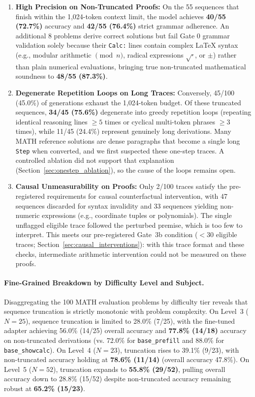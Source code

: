\documentclass[11pt,a4paper]{article}
\begin{document}
\begin{enumerate}
    \item \textbf{High Precision on Non-Truncated Proofs:} On the 55 sequences that finish within the 1,024-token context limit, the model achieves \textbf{40/55 (72.7\%)} accuracy and \textbf{42/55 (76.4\%)} strict grammar adherence. An additional 8 problems derive correct solutions but fail Gate 0 grammar validation solely because their \texttt{Calc:} lines contain complex \LaTeX{} syntax (e.g., modular arithmetic $\pmod{n}$, radical expressions $\sqrt{\cdot}$, or $\pm$) rather than plain numerical evaluations, bringing true non-truncated mathematical soundness to \textbf{48/55 (87.3\%)}.
    \item \textbf{Degenerate Repetition Loops on Long Traces:} Conversely, 45/100 (45.0\%) of generations exhaust the 1,024-token budget. Of these truncated sequences, \textbf{34/45 (75.6\%)} degenerate into greedy repetition loops (repeating identical reasoning lines $\ge 5$ times or cyclical multi-token phrases $\ge 3$ times), while 11/45 (24.4\%) represent genuinely long derivations. Many MATH reference solutions are dense paragraphs that become a single long \texttt{Step} when converted, and we first suspected these one-step traces. A controlled ablation did not support that explanation (Section~\ref{sec:onestep_ablation}), so the cause of the loops remains open.
    \item \textbf{Causal Unmeasurability on Proofs:} Only 2/100 traces satisfy the pre-registered requirements for causal counterfactual intervention, with 47 sequences discarded for syntax invalidity and 33 sequences yielding non-numeric expressions (e.g., coordinate tuples or polynomials). The single unflagged eligible trace followed the perturbed premise, which is too few to interpret. This meets our pre-registered Gate~3b condition ($< 30$ eligible traces; Section~\ref{sec:causal_interventions}): with this trace format and these checks, intermediate arithmetic intervention could not be measured on these proofs.
\end{enumerate}

\paragraph{Fine-Grained Breakdown by Difficulty Level and Subject.}
Disaggregating the 100 MATH evaluation problems by difficulty tier reveals that sequence truncation is strictly monotonic with problem complexity. On Level~3 ($N=25$), sequence truncation is limited to 28.0\% (7/25), with the fine-tuned adapter achieving 56.0\% (14/25) overall accuracy and \textbf{77.8\% (14/18)} accuracy on non-truncated derivations (vs. 72.0\% for \texttt{base\_prefill} and 88.0\% for \texttt{base\_showcalc}). On Level~4 ($N=23$), truncation rises to 39.1\% (9/23), with non-truncated accuracy holding at \textbf{78.6\% (11/14)} (overall accuracy 47.8\%). On Level~5 ($N=52$), truncation expands to \textbf{55.8\% (29/52)}, pulling overall accuracy down to 28.8\% (15/52) despite non-truncated accuracy remaining robust at \textbf{65.2\% (15/23)}. 
\end{document}
